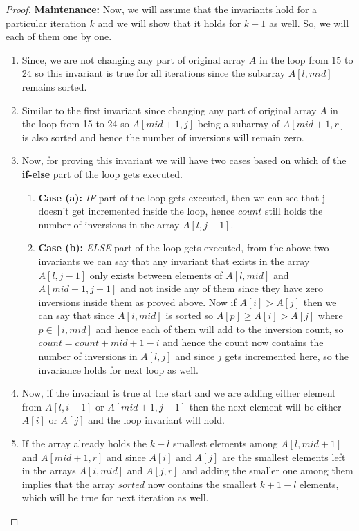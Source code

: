 \documentclass{article}
\begin{document}
{\begin {proof}
        \textbf{Maintenance:} Now, we will assume that the invariants hold for a particular iteration $k$ and we will show that it holds for $k+1$ as well. So, we will each of them one by one.
        \begin{enumerate}[i] 
            \item Since, we are not changing any part of original array $A$ in the loop from 15 to 24 so this invariant is true for all iterations since the subarray $A[l, mid]$ remains sorted.
            \item Similar to the first invariant since changing any part of original array $A$ in the loop from 15 to 24 so $A[mid+1, j]$ being a subarray of $A[mid+1, r]$ is also sorted and hence the number of inversions will remain zero.
            \item Now, for proving this invariant we will have two cases based on which of the \textbf{if-else} part of the loop gets executed. 
            \begin{enumerate}[a]
            \item \textbf{Case (a):} \emph{IF} part of the loop gets executed, then we can see that j doesn't get incremented inside the loop, hence $count$ still holds the number of inversions in the array $A[l, j-1]$.
            \item \textbf{Case (b):} \emph{ELSE} part of the loop gets executed, from the above two invariants we can say that any invariant that exists in the array $A[l, j-1]$ only exists between elements of $A[l, mid]$ and $A[mid+1, j-1]$ and not inside any of them since they have zero inversions inside them as proved above. Now if $A[i] > A[j]$ then we can say that since $A[i, mid]$ is sorted so $A[p] \geq A[i] > A[j]$ where $p \in [i, mid]$ and hence each of them will add to the inversion count, so $count = count + mid + 1 - i$ and hence the count now contains the number of inversions in $A[l, j]$ and since $j$ gets incremented here, so the invariance holds for next loop as well.
            \end{enumerate}
            \item Now, if the invariant is true at the start and we are adding either element from $A[l, i-1]$ or $A[mid+1, j-1]$ then the next element will be either $A[i]$ or $A[j]$ and the loop invariant will hold. 
            \item If the array already holds the $k-l$ smallest elements among $A[l, mid+1]$ and $A[mid+1, r]$ and since $A[i]$ and $A[j]$ are the smallest elements left in the arrays $A[i, mid]$ and $A[j, r]$ and adding the smaller one among them implies that the array $sorted$ now contains the smallest $k+1-l$ elements, which will be true for next iteration as well.

\end{enumerate}
\end{proof}}
\end{document}
